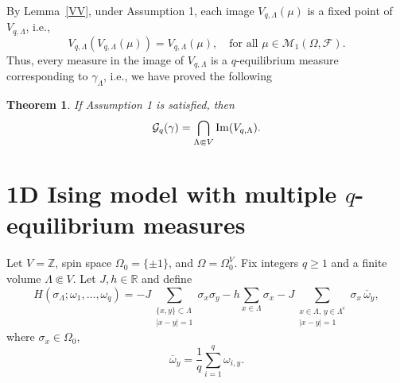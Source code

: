 \documentclass[11pt,reqno]{amsart}
\newtheorem{thm}{Theorem}
\numberwithin{equation}{section} \setcounter{tocdepth}{1}
\begin{document}
\medskip
By Lemma~\ref{VV}, under Assumption 1, each image $V_{q,\Lambda}(\mu)$ is a fixed point of $V_{q,\Lambda}$, i.e.,
$$
V_{q,\Lambda}(V_{q,\Lambda}(\mu)) = V_{q,\Lambda}(\mu),
\quad \text{for all } \mu \in \mathcal M_1(\Omega, \mathcal F).
$$
Thus, every measure in the image of $V_{q,\Lambda}$ is a $q$-equilibrium measure
corresponding to $\gamma_\Lambda$, i.e., we have proved the following

\begin{thm}\label{thm:Gq-image}
	If Assumption 1 is satisfied, then
	$$
	{\mathcal G}_q(\gamma)
	= \bigcap_{\Lambda\Subset V} {\rm Im}(V_{q,\Lambda}).
	$$
	\end{thm}

\section{1D Ising model with multiple $q$-equilibrium measures}

Let $V = \mathbb{Z}$, spin space $\Omega_0 = \{\pm1\}$, and $\Omega = \Omega_0^V$. Fix integers $q \ge 1$ and a finite volume $\Lambda \Subset V$. Let $J, h\in \mathbb{R}$  and define 
\begin{equation}\label{1dh}  H(\sigma_\Lambda; \omega_1, \dots, \omega_q) = -J \sum_{\substack{\{x,y\} \subset \Lambda \\ |x-y|=1}} \sigma_x \sigma_y - h \sum_{x \in \Lambda} \sigma_x - J \sum_{\substack{x \in \Lambda,\, y \in \Lambda^c \\ |x-y|=1}} \sigma_x \, \overline{\omega}_y, \end{equation}
where $\sigma_x\in \Omega_0$, $$ \overline{\omega}_y = \frac{1}{q} \sum_{i=1}^q \omega_{i,y}. $$ 
\end{document}
